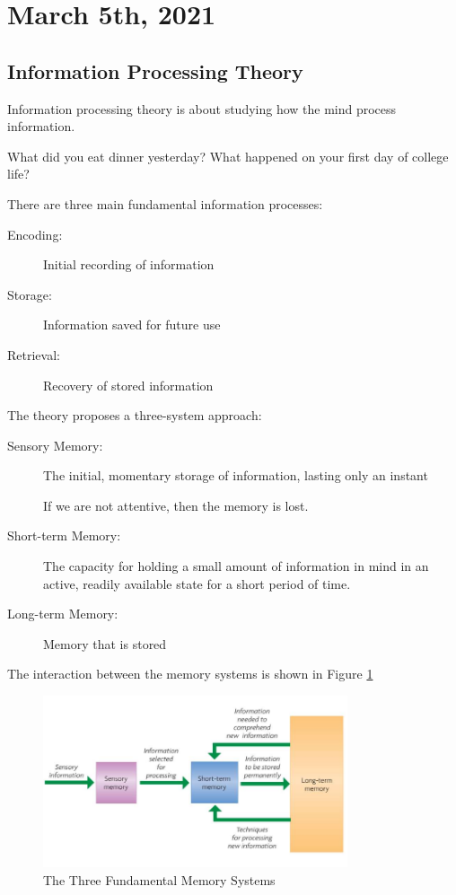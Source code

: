 \documentclass[../main/main.tex]{subfiles}
\begin{document}
\section{March 5th, 2021}
\subsection{Information Processing Theory}
Information processing theory is about studying how the mind process information.
\begin{example}
 What did you eat dinner yesterday? What happened on your first day of college life?
\end{example}
There are three main fundamental information processes:

\begin{description}
  \item[Encoding:] Initial recording of information
  \item[Storage:] Information saved for future use
  \item[Retrieval:] Recovery of stored information
\end{description}
The theory proposes a three-system approach:
\begin{description}
  \item[Sensory Memory:] The initial, momentary storage of information, lasting only an instant
    \begin{remark}
If we are not attentive, then the memory is lost.
                                \end{remark}
  \item[Short-term Memory:] The capacity for holding a small amount of information in mind in an active, readily available state for a short period of time.
  \item[Long-term Memory:] Memory that is stored
\end{description}
    The interaction between the memory systems is shown in Figure \ref{fig:3-5-ipt}
\begin{figure}[h!]
	    \centering
	    \includegraphics[width=0.8\textwidth]{../images/3-5-ipt}
	        \caption{The Three Fundamental Memory Systems}
	    \label{fig:3-5-ipt}
    \end{figure}
\end{document}
